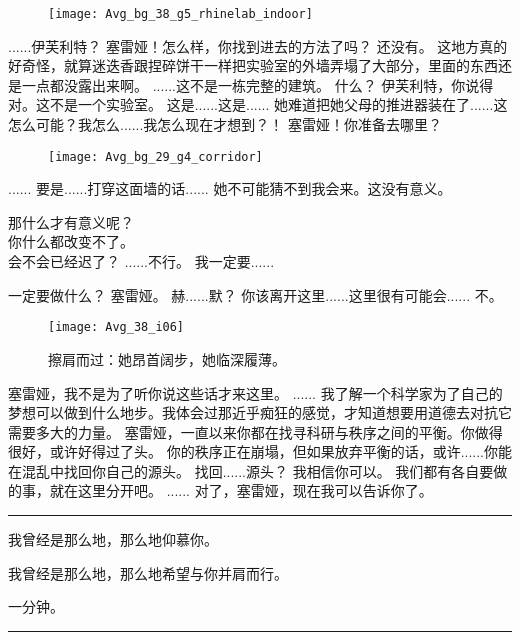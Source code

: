 \documentclass[openany]{book}
\begin{document}
\begin{figure}[h]
    \centering
    \texttt{[image: Avg\_bg\_38\_g5\_rhinelab\_indoor]}
\end{figure}
\begin{dialogue}
     ......伊芙利特？
     塞雷娅！怎么样，你找到进去的方法了吗？
     还没有。
     这地方真的好奇怪，就算迷迭香跟捏碎饼干一样把实验室的外墙弄塌了大部分，里面的东西还是一点都没露出来啊。
     ......这不是一栋完整的建筑。
     什么？
     伊芙利特，你说得对。这不是一个实验室。
     这是......这是......
     她难道把她父母的推进器装在了......这怎么可能？我怎么......我怎么现在才想到？！
     塞雷娅！你准备去哪里？
    \begin{figure}[h]
        \centering
        \texttt{[image: Avg\_bg\_29\_g4\_corridor]}
    \end{figure}
     ......
     要是......打穿这面墙的话......
     她不可能猜不到我会来。这没有意义。\par
    那什么才有意义呢？\\
    你什么都改变不了。\\
    会不会已经迟了？
     ......不行。
     我一定要......\par
    一定要做什么？
     塞雷娅。
     赫......默？
     你该离开这里......这里很有可能会......
     不。
    \begin{figure}[h]
        \caption*{擦肩而过：她昂首阔步，她临深履薄。}
        \centering
        \texttt{[image: Avg\_38\_i06]}
    \end{figure}
     塞雷娅，我不是为了听你说这些话才来这里。
     ......
     我了解一个科学家为了自己的梦想可以做到什么地步。我体会过那近乎痴狂的感觉，才知道想要用道德去对抗它需要多大的力量。
     塞雷娅，一直以来你都在找寻科研与秩序之间的平衡。你做得很好，或许好得过了头。
     你的秩序正在崩塌，但如果放弃平衡的话，或许......你能在混乱中找回你自己的源头。
     找回......源头？
     我相信你可以。
     我们都有各自要做的事，就在这里分开吧。
     ......
     对了，塞雷娅，现在我可以告诉你了。
\end{dialogue}

\par\noindent\rule{\textwidth}{0.4pt}\par
我曾经是那么地，那么地仰慕你。\par
我曾经是那么地，那么地希望与你并肩而行。\par
一分钟。
\par\noindent\rule{\textwidth}{0.4pt}
\end{document}
